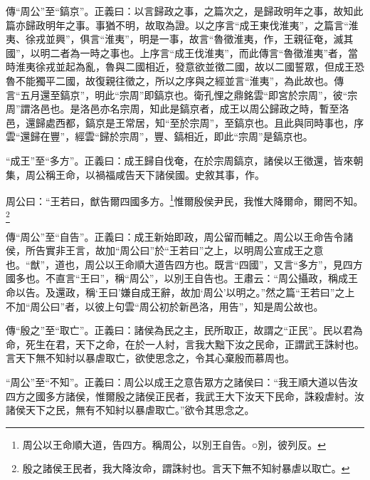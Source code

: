 {\noindent\zhuan{}\fzbyks 傳“周公”至“鎬京”。正義曰：以言歸政之事，之篇次之，是歸政明年之事，故知此篇亦歸政明年之事。事猶不明，故取為證。以之序言“成王東伐淮夷”，之篇言“淮夷、徐戎並興”，俱言“淮夷”，明是一事，故言“魯徵淮夷，作，王親征奄，滅其國”，以明二者為一時之事也。上序言“成王伐淮夷”，而此傳言“魯徵淮夷”者，當時淮夷徐戎並起為亂，魯與二國相近，發意欲並徵二國，故以二國誓眾，但成王恐魯不能獨平二國，故復親往徵之，所以之序與之經並言“淮夷”，為此故也。傳言“五月還至鎬京”，明此“宗周”即鎬京也。衛孔悝之鼎銘雲“即宮於宗周”，彼“宗周”謂洛邑也。是洛邑亦名宗周，知此是鎬京者，成王以周公歸政之時，暫至洛邑，還歸處西都，鎬京是王常居，知“至於宗周”，至鎬京也。且此與同時事也，序雲“還歸在豐”，經雲“歸於宗周”，豐、鎬相近，即此“宗周”是鎬京也。 \par}

{\noindent\shu{}\fzkt “成王”至“多方”。正義曰：成王歸自伐奄，在於宗周鎬京，諸侯以王徵還，皆來朝集，周公稱王命，以禍福咸告天下諸侯國。史敘其事，作。 \par}

周公曰：“王若曰，猷告爾四國多方。\footnote{周公以王命順大道，告四方。稱周公，以別王自告。○別，彼列反。}惟爾殷侯尹民，我惟大降爾命，爾罔不知。\footnote{殷之諸侯王民者，我大降汝命，謂誅紂也。言天下無不知紂暴虐以取亡。}


{\noindent\zhuan{}\fzbyks 傳“周公”至“自告”。正義曰：成王新始即政，周公留而輔之。周公以王命告令諸侯，所告實非王言，故加“周公曰”於“王若曰”之上，以明周公宣成王之意也。“猷”，道也，周公以王命順大道告四方也。既言“四國”，又言“多方”，見四方國多也。不直言“王曰”，稱“周公”，以別王自告也。王肅云：“周公攝政，稱成王命以告。及還政，稱‘王曰’嫌自成王辭，故加‘周公’以明之。”然之篇“王若曰”之上不加“周公曰”者，以彼上句雲“周公初於新邑洛，用告”，知是周公故也。 \par}

{\noindent\zhuan{}\fzbyks 傳“殷之”至“取亡”。正義曰：諸侯為民之主，民所取正，故謂之“正民”。民以君為命，死生在君，天下之命，在於一人紂，言我大黜下汝之民命，正謂武王誅紂也。言天下無不知紂以暴虐取亡，欲使思念之，令其心棄殷而慕周也。 \par}

{\noindent\shu{}\fzkt “周公”至“不知”。正義曰：周公以成王之意告眾方之諸侯曰：“我王順大道以告汝四方之國多方諸侯，惟爾殷之諸侯正民者，我武王大下汝天下民命，誅殺虐紂。汝諸侯天下之民，無有不知紂以暴虐取亡。”欲令其思念之。 \par}

